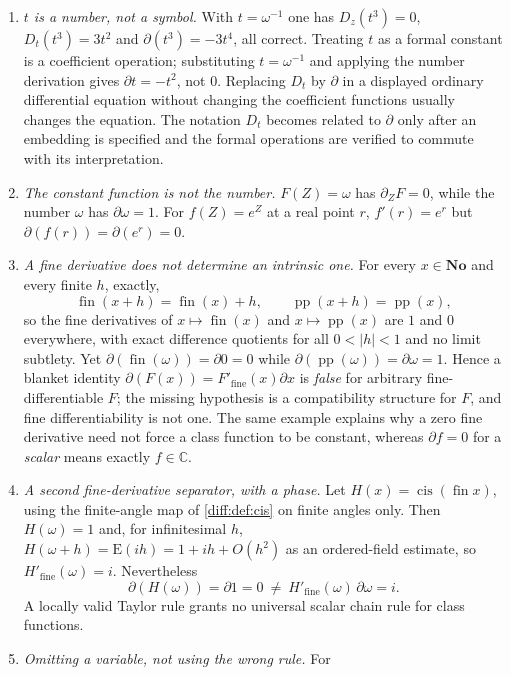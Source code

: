 \documentclass[11pt,letterpaper]{article}
\numberwithin{equation}{section}
\theoremstyle{definition}
\theoremstyle{remark}
\newcommand{\No}{\mathbf{No}}
\newcommand{\C}{\mathbb C}
\newcommand{\der}{\partial}
\newcommand{\pp}{\operatorname{pp}}
\newcommand{\fin}{\operatorname{fin}}
\newcommand{\cis}{\operatorname{cis}}
\newcommand{\Emm}{\mathrm{E}}
\newcommand{\derZ}{\der_{Z}}
\newcommand{\Dz}{D_{z}}
\newcommand{\abs}[1]{\lvert#1\rvert}
\begin{document}
\begin{warning}
\label{diff:warn:separators}
\begin{enumerate}[label=(\arabic*),leftmargin=2.4em]
\item\emph{$t$ is a number, not a symbol.} With $t=\omega^{-1}$ one has
$\Dz(t^{3})=0$, $D_{t}(t^{3})=3t^{2}$ and $\der(t^{3})=-3t^{4}$, all correct.
Treating $t$ as a formal constant is a coefficient operation; substituting
$t=\omega^{-1}$ and applying the number derivation gives $\der t=-t^{2}$, not
$0$. Replacing $D_{t}$ by $\der$ in a displayed ordinary differential equation
without changing the coefficient functions usually changes the equation. The
notation $D_{t}$ becomes related to $\der$ only after an embedding is specified
and the formal operations are verified to commute with its interpretation.
\item\emph{The constant function is not the number.} $F(Z)=\omega$ has
$\derZ F=0$, while the number $\omega$ has $\der\omega=1$. For $f(Z)=e^{Z}$ at
a real point $r$, $f'(r)=e^{r}$ but $\der(f(r))=\der(e^{r})=0$.
\item\emph{A fine derivative does not determine an intrinsic one.} For every
$x\in\No$ and every finite $h$, exactly,
\[
 \fin(x+h)=\fin(x)+h,\qquad \pp(x+h)=\pp(x),
\]
so the fine derivatives of $x\mapsto\fin(x)$ and $x\mapsto\pp(x)$ are $1$ and
$0$ everywhere, with exact difference quotients for all $0<\abs h<1$ and no
limit subtlety. Yet $\der(\fin(\omega))=\der0=0$ while
$\der(\pp(\omega))=\der\omega=1$. Hence a blanket identity
$\der(F(x))=F'_{\mathrm{fine}}(x)\der x$ is \emph{false} for arbitrary
fine-differentiable $F$; the missing hypothesis is a compatibility structure
for $F$, and fine differentiability is not one. The same example explains why a
zero fine derivative need not force a class function to be constant, whereas
$\der f=0$ for a \emph{scalar} means exactly $f\in\C$.
\item\emph{A second fine-derivative separator, with a phase.} Let
$H(x)=\cis(\fin x)$, using the finite-angle map of
\cref{diff:def:cis} on finite angles only. Then $H(\omega)=1$ and, for
infinitesimal $h$, $H(\omega+h)=\Emm(ih)=1+ih+O(h^{2})$ as an ordered-field
estimate, so $H'_{\mathrm{fine}}(\omega)=i$. Nevertheless
\[
 \der(H(\omega))=\der 1=0\ \neq\ H'_{\mathrm{fine}}(\omega)\,\der\omega=i .
\]
A locally valid Taylor rule grants no universal scalar chain rule for class
functions.
\item\emph{Omitting a variable, not using the wrong rule.} For

\end{enumerate}
\end{warning}
\end{document}
